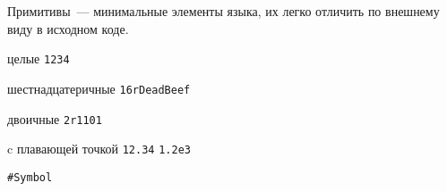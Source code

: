 \clearpage
{}\label{prim}\secdown

Примитивы\ --- минимальные элементы языка, их легко отличить по внешнему виду в исходном коде.


\begin{description}
    \item{целые}  \verb|1234|
    \item{шестнадцатеричные}  \verb|16rDeadBeef|
    \item{двоичные}  \verb|2r1101|
    \item{c плавающей точкой}  \verb|12.34| \verb|1.2e3|
\end{description}


 \verb|#Symbol|


\secup

